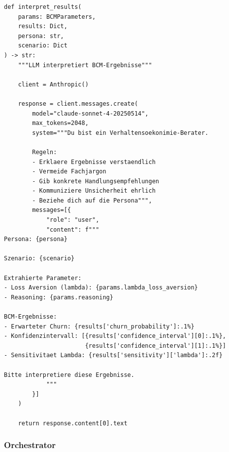 \documentclass[12pt,a4paper]{article}
\begin{document}
\begin{lstlisting}[caption={Phase 3: LLM-basierte Interpretation}]
def interpret_results(
    params: BCMParameters,
    results: Dict,
    persona: str,
    scenario: Dict
) -> str:
    """LLM interpretiert BCM-Ergebnisse"""

    client = Anthropic()

    response = client.messages.create(
        model="claude-sonnet-4-20250514",
        max_tokens=2048,
        system="""Du bist ein Verhaltensoekonimie-Berater.

        Regeln:
        - Erklaere Ergebnisse verstaendlich
        - Vermeide Fachjargon
        - Gib konkrete Handlungsempfehlungen
        - Kommuniziere Unsicherheit ehrlich
        - Beziehe dich auf die Persona""",
        messages=[{
            "role": "user",
            "content": f"""
Persona: {persona}

Szenario: {scenario}

Extrahierte Parameter:
- Loss Aversion (lambda): {params.lambda_loss_aversion}
- Reasoning: {params.reasoning}

BCM-Ergebnisse:
- Erwarteter Churn: {results['churn_probability']:.1%}
- Konfidenzintervall: [{results['confidence_interval'][0]:.1%},
                       {results['confidence_interval'][1]:.1%}]
- Sensitivitaet Lambda: {results['sensitivity']['lambda']:.2f}

Bitte interpretiere diese Ergebnisse.
            """
        }]
    )

    return response.content[0].text
\end{lstlisting}

\subsubsection{Orchestrator}
\end{document}

